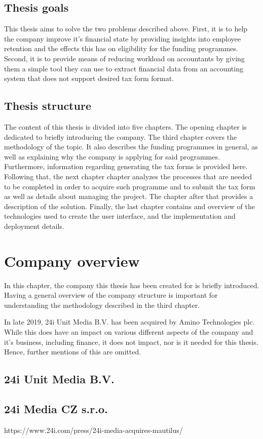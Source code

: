 \documentclass[12pt,oneside]{fithesis2}
\begin{document}
    \section{Thesis goals}
    This thesis aims to solve the two problems described above. First, it is to help the company improve it's financial state by providing insights into employee retention and the effects this has on eligibility for the funding programmes. Second, it is to provide means of reducing workload on accountants by giving them a simple tool they can use to extract financial data from an accounting system that does not support desired tax form format.
    \section{Thesis structure}
    The content of this thesis is divided into five chapters. The opening chapter is dedicated to briefly introducing the company. The third chapter covers the methodology of the topic. It also describes the funding programmes in general, as well as explaining why the company is applying for said programmes. Furthermore, information regarding generating the tax forms is provided here. Following that, the next chapter chapter analyzes the processes that are needed to be completed in order to acquire such programme and to submit the tax form as well as details about managing the project. The chapter after that provides a description of the solution. Finally, the last chapter contains and overview of the technologies used to create the user interface, and the implementation and deployment details.
    \chapter{Company overview}
    In this chapter, the company this thesis has been created for is briefly introduced. Having a general overview of the company structure is important for understanding the methodology described in the third chapter.
    \par
    In late 2019, 24i Unit Media B.V. has been acquired by Amino Technologies plc. \cite{amino} While this does have an impact on various different aspects of the company and it's business, including finance, it does not impact, nor is it needed for this thesis. Hence, further mentions of this are omitted.
    \section{24i Unit Media B.V.}
    \section{24i Media CZ s.r.o.}
    https://www.24i.com/press/24i-media-acquires-mautilus/
\end{document}
